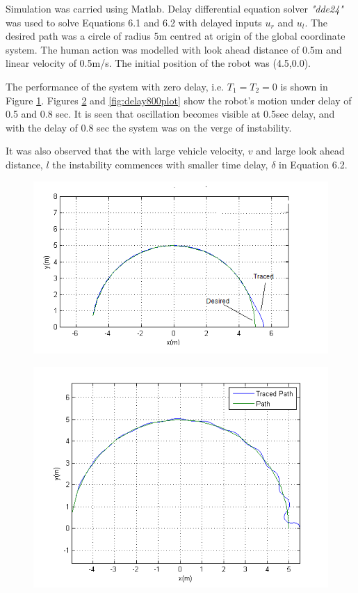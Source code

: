 Simulation was carried using Matlab. Delay differential equation solver \textit{"dde24"} was used to solve Equations 6.1 and 6.2 with delayed inputs $u_r$ and $u_l$.  The desired path  was a circle of radius 5m centred at origin of the global coordinate system. The human action was modelled with look ahead distance of 0.5m and linear velocity of 0.5m/s. The initial position of the robot was (4.5,0.0).

 The  performance of the system with zero delay, i.e. $T_1=T_2=0$ is shown in Figure \ref{fig:nodelayplot}. Figures \ref{fig:delay500plot} and \ref{fig:delay800plot} show the   robot's motion under delay of 0.5 and 0.8 sec.  It is seen that oscillation becomes visible at 0.5sec delay, and with the delay of  0.8 sec the system was on the verge of instability. 
 
 It was also observed that the with large vehicle velocity, $v$ and large look ahead distance, $l$ the instability commences with smaller time delay, $\delta$ in Equation 6.2.  
\begin{figure}[h]
	\includegraphics[width=\linewidth,keepaspectratio]{Chapter6/fig/noDelay}
	\label{fig:nodelayplot} 
\end{figure} 
\begin{figure}[h]
	\includegraphics[width=\linewidth,keepaspectratio]{Chapter6/fig/Delay500milsec}
	\label{fig:delay500plot} 
\end{figure} 

